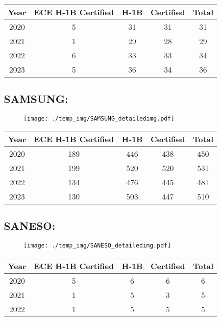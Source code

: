\documentclass{article}%
\begin{document}
%
\begin{longtable}{c|c|c|c|c}%
\hline%
Year&ECE H{-}1B Certified&H{-}1B&Certified&Total\\%
\hline%
2020&5&31&31&31\\%
\hline%
2021&1&29&28&29\\%
\hline%
2022&6&33&33&34\\%
\hline%
2023&5&36&34&36\\%
\hline%
\end{longtable}

%
\newpage%
\subsection{SAMSUNG:}%
\label{subsec:SAMSUNG}%
\label{SAMSUNGdetailed}%


\begin{figure}[htbp]%
\centering%
\texttt{[image: ./temp\_img/SAMSUNG\_detailedimg.pdf]}%
\end{figure}

%
\begin{longtable}{c|c|c|c|c}%
\hline%
Year&ECE H{-}1B Certified&H{-}1B&Certified&Total\\%
\hline%
2020&189&446&438&450\\%
\hline%
2021&199&520&520&531\\%
\hline%
2022&134&476&445&481\\%
\hline%
2023&130&503&447&510\\%
\hline%
\end{longtable}

%
\newpage%
\subsection{SANESO:}%
\label{subsec:SANESO}%
\label{SANESOdetailed}%


\begin{figure}[htbp]%
\centering%
\texttt{[image: ./temp\_img/SANESO\_detailedimg.pdf]}%
\end{figure}

%
\begin{longtable}{c|c|c|c|c}%
\hline%
Year&ECE H{-}1B Certified&H{-}1B&Certified&Total\\%
\hline%
2020&5&6&6&6\\%
\hline%
2021&1&5&3&5\\%
\hline%
2022&1&5&5&5\\%
\hline%
\end{longtable}
\end{document}
